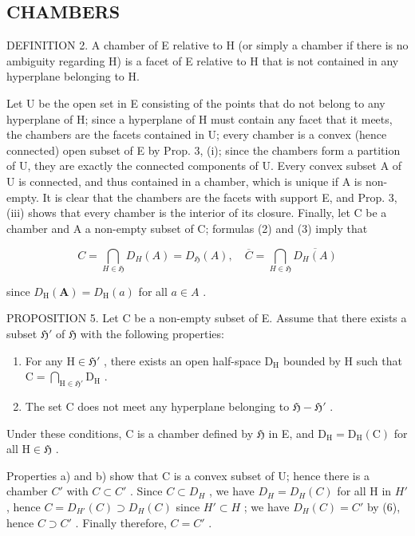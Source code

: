 \subsection{CHAMBERS}

DEFINITION 2. A chamber of E relative to H (or simply a chamber if there is no ambiguity regarding H) is a facet of E relative to H that is not contained in any hyperplane belonging to H.

Let U be the open set in E consisting of the points that do not belong to any hyperplane of H; since a hyperplane of H must contain any facet that it meets, the chambers are the facets contained in U; every chamber is a convex (hence connected) open subset of E by Prop. 3, (i); since the chambers form a partition of U, they are exactly the connected components of U. Every convex subset A of U is connected, and thus contained in a chamber, which is unique if A is non-empty. It is clear that the chambers are the facets with support E, and Prop. 3, (iii) shows that every chamber is the interior of its closure. Finally, let C be a chamber and A a non-empty subset of C; formulas (2) and (3) imply that

\[
C = \bigcap_ {H \in \mathfrak {H}} D _ {H} (A) = D _ {\mathfrak {H}} (A), \quad \overline {{C}} = \bigcap_ {H \in \mathfrak {H}} \overline {{D _ {H} (A)}}\tag{6}
\]

since \(D_{\mathrm{H}}(\mathbf{A}) = D_{\mathrm{H}}(a)\) for all \(a \in A\) .

PROPOSITION 5. Let C be a non-empty subset of E. Assume that there exists a subset \(\mathfrak{H}'\) of \(\mathfrak{H}\) with the following properties:

\begin{enumerate}
\def\labelenumi{\alph{enumi})}
\item
  For any \(\mathrm{H} \in \mathfrak{H}'\) , there exists an open half-space \(\mathrm{D}_{\mathrm{H}}\) bounded by \(\mathrm{H}\) such that \(\mathrm{C} = \bigcap_{\mathrm{H} \in \mathfrak{H}'} \mathrm{D}_{\mathrm{H}}\) .
\item
  The set C does not meet any hyperplane belonging to \(\mathfrak{H} - \mathfrak{H}'\) .
\end{enumerate}

Under these conditions, C is a chamber defined by \(\mathfrak{H}\) in E, and \(\mathrm{D_H} = \mathrm{D_H(C)}\) for all \(\mathrm{H} \in \mathfrak{H}\) .

Properties a) and b) show that C is a convex subset of U; hence there is a chamber \(C'\) with \(C \subset C'\) . Since \(C \subset D_{H}\) , we have \(D_{H} = D_{H}(C)\) for all H in \(H'\) , hence \(C = D_{H'}(C) \supset D_{H}(C)\) since \(H' \subset H\) ; we have \(D_{H}(C) = C'\) by (6), hence \(C \supset C'\) . Finally therefore, \(C = C'\) .

